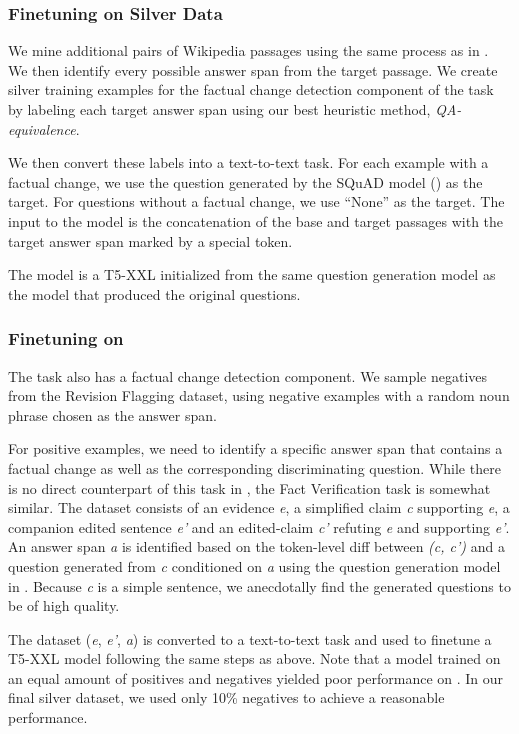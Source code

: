 \subsubsection*{Finetuning on Silver Data}
\label{Method:Finetuning on QA-equivalencea}
We mine additional pairs of Wikipedia passages using the same process as in . We then identify every possible answer span from the target passage. We create silver training examples for the factual change detection component of the task by labeling each target answer span using our best heuristic method, \textit{QA-equivalence}.

We then convert these labels into a text-to-text task. For each example with a factual change, we use the question generated by the SQuAD model () as the target. For questions without a factual change, we use ``None'' as the target. The input to the model is the concatenation of the base and target passages with the target answer span marked by a special token.

The model is a T5-XXL initialized from the same question generation model as the model that produced the original questions.



\subsubsection*{Finetuning on \vitaminc{}}
The \vitaminc{} task \cite{schuster-etal-2021-get} also has a factual change detection component. We sample negatives from the \vitaminc{} Revision Flagging dataset, using negative examples with a random noun phrase chosen as the answer span.

For positive examples, we need to identify a specific answer span that contains a factual change as well as the corresponding discriminating question. While there is no direct counterpart of this task in \vitaminc{}, the Fact Verification task is somewhat similar. The dataset consists of an evidence \emph{e}, a simplified claim \emph{c} supporting \emph{e}, a companion edited sentence \emph{e'} and an edited-claim \emph{c'} refuting \emph{e} and supporting \emph{e'}. An answer span \emph{a} is identified based on the token-level diff between \emph{(c, c')} and a question generated from \emph{c} conditioned on \emph{a} using the question generation model in . Because \emph{c} is a simple sentence, we anecdotally find the generated questions to be of high quality.

The dataset (\emph{e}, \emph{e'}, \emph{a}) is converted to a text-to-text task and used to finetune a T5-XXL model following the same steps as above.
Note that a model trained on an equal amount of positives and negatives yielded poor performance on \dataset{}. In our final \vitaminc{} silver dataset, we used only 10\%  negatives to achieve a reasonable performance.